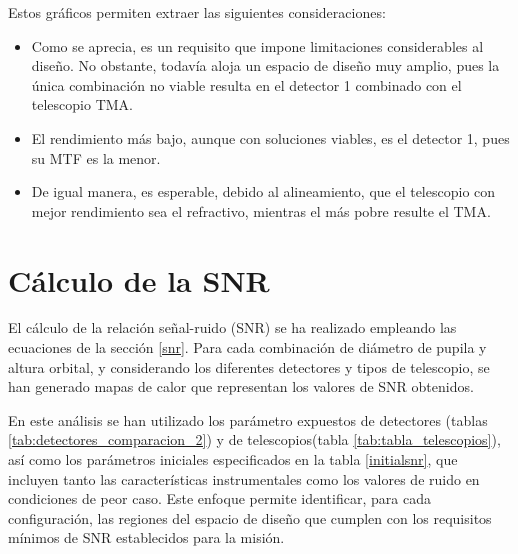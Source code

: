 Estos gráficos permiten extraer las siguientes consideraciones:

\begin{itemize}
    \item Como se aprecia, es un requisito que impone limitaciones considerables al diseño. No obstante, todavía aloja un espacio de diseño muy amplio, pues la única combinación no viable resulta en el detector 1 combinado con el telescopio TMA.
    \item El rendimiento más bajo, aunque con soluciones viables, es el detector 1, pues su MTF es la menor.
    \item De igual manera, es esperable, debido al alineamiento, que el telescopio con mejor rendimiento sea el refractivo, mientras el más pobre resulte el TMA.
\end{itemize}

\section{Cálculo de la SNR}

El cálculo de la relación señal-ruido (SNR) se ha realizado empleando las ecuaciones de la sección \ref{snr}. Para cada combinación de diámetro de pupila y altura orbital, y considerando los diferentes detectores y tipos de telescopio, se han generado mapas de calor que representan los valores de SNR obtenidos.

En este análisis se han utilizado los parámetro expuestos de detectores (tablas \ref{tab:detectores_comparacion_2}) y de telescopios(tabla \ref{tab:tabla_telescopios}), así como los parámetros iniciales especificados en la tabla \ref{initialsnr}, que incluyen tanto las características instrumentales como los valores de ruido en condiciones de peor caso. Este enfoque permite identificar, para cada configuración, las regiones del espacio de diseño que cumplen con los requisitos mínimos de SNR establecidos para la misión.


